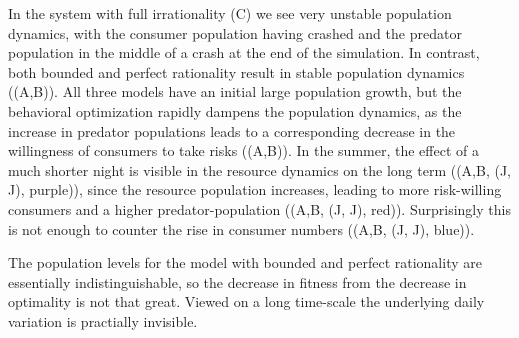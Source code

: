 In the system with full irrationality (C) we see very unstable population dynamics, with the consumer population having crashed and the predator population in the middle of a crash at the end of the simulation. In contrast, both bounded and perfect rationality result in stable population dynamics ((A,B)). All three models have an initial large population growth, but the behavioral optimization rapidly dampens the population dynamics, as the increase in predator populations leads to a corresponding decrease in the willingness of consumers to take risks ((A,B)). In the summer, the effect of a much shorter night is visible in the resource dynamics on the long term ((A,B, (J, J), purple)), since the resource population increases, leading to more risk-willing consumers and a higher predator-population ((A,B, (J, J), red)). Surprisingly this is not enough to counter the rise in consumer numbers ((A,B, (J, J), blue)).

 The population levels for the model with bounded and perfect rationality are essentially indistinguishable, so the decrease in fitness from the decrease in optimality is not that great. Viewed on a long time-scale the underlying daily variation is practially invisible.


